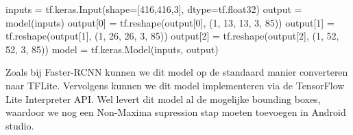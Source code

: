 \begin{python}
inputs = tf.keras.Input(shape=[416,416,3], dtype=tf.float32)
output = model(inputs)
output[0] =  tf.reshape(output[0], (1, 13, 13, 3, 85))
output[1] =  tf.reshape(output[1], (1, 26, 26, 3, 85))
output[2] =  tf.reshape(output[2], (1, 52, 52, 3, 85))
model = tf.keras.Model(inputs, output)
\end{python}

Zoals bij Faster-RCNN kunnen we dit model op de standaard manier converteren naar TFLite.
Vervolgens kunnen we dit model implementeren via de TensorFlow Lite Interpreter API.
Wel levert dit model al de mogelijke bounding boxes, waardoor we nog een Non-Maxima supression stap moeten toevoegen in Android studio.